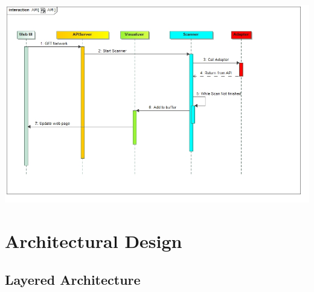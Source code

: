 \documentclass[hidelinks,a4paper,12pt]{article}
\begin{document}
\includegraphics[width=1.00\textwidth]{./images/API.jpg}\\[0.4cm] 
\newpage
\section{Architectural Design}
\subsection{Layered Architecture} 
\end{document}
